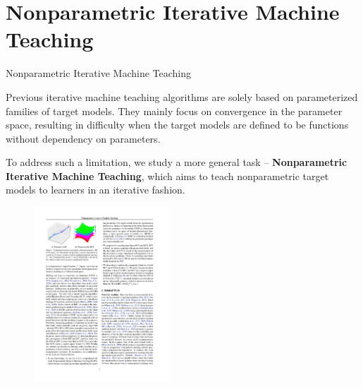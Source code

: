 \documentclass[aspectratio=169,xcolor=dvipsnames]{beamer}
\begin{document}
\section{Nonparametric Iterative Machine Teaching}
\begin{frame}{Nonparametric Iterative Machine Teaching}

\justify
Previous iterative machine teaching algorithms \cite{liu2017iterative, liu2018towards, xu2021locality, wang2021gradient} are solely based on \alert{parameterized} families of target models. They mainly focus on convergence in the parameter space, resulting in difficulty when the target models are defined to be \alert{functions without dependency on parameters}. 

\vspace{1mm}

To address such a limitation, we study a more general task -- {\bf Nonparametric Iterative Machine Teaching}, which aims to teach {\color{red} nonparametric target models} to learners in an iterative fashion.

\vspace{-3mm}

\begin{figure}
  \centering
  \includegraphics[width=0.45\textwidth]{comp.pdf}
\end{figure}
\end{frame}
\end{document}
